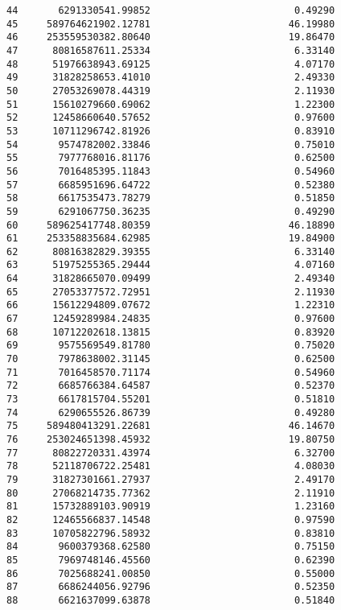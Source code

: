 \documentclass[11pt]{article}
\begin{document}
\begin{tcolorbox}[breakable, size=fbox, boxrule=.5pt, pad at break*=1mm, opacityfill=0]
\begin{Verbatim}[commandchars=\\\{\}]
44       6291330541.99852                         0.49290
45     589764621902.12781                        46.19980
46     253559530382.80640                        19.86470
47      80816587611.25334                         6.33140
48      51976638943.69125                         4.07170
49      31828258653.41010                         2.49330
50      27053269078.44319                         2.11930
51      15610279660.69062                         1.22300
52      12458660640.57652                         0.97600
53      10711296742.81926                         0.83910
54       9574782002.33846                         0.75010
55       7977768016.81176                         0.62500
56       7016485395.11843                         0.54960
57       6685951696.64722                         0.52380
58       6617535473.78279                         0.51850
59       6291067750.36235                         0.49290
60     589625417748.80359                        46.18890
61     253358835684.62985                        19.84900
62      80816382829.39355                         6.33140
63      51975255365.29444                         4.07160
64      31828665070.09499                         2.49340
65      27053377572.72951                         2.11930
66      15612294809.07672                         1.22310
67      12459289984.24835                         0.97600
68      10712202618.13815                         0.83920
69       9575569549.81780                         0.75020
70       7978638002.31145                         0.62500
71       7016458570.71174                         0.54960
72       6685766384.64587                         0.52370
73       6617815704.55201                         0.51810
74       6290655526.86739                         0.49280
75     589480413291.22681                        46.14670
76     253024651398.45932                        19.80750
77      80822720331.43974                         6.32700
78      52118706722.25481                         4.08030
79      31827301661.27937                         2.49170
80      27068214735.77362                         2.11910
81      15732889103.90919                         1.23160
82      12465566837.14548                         0.97590
83      10705822796.58932                         0.83810
84       9600379368.62580                         0.75150
85       7969748146.45560                         0.62390
86       7025688241.00850                         0.55000
87       6686244056.92796                         0.52350
88       6621637099.63878                         0.51840

\end{Verbatim}
\end{tcolorbox}
\end{document}
